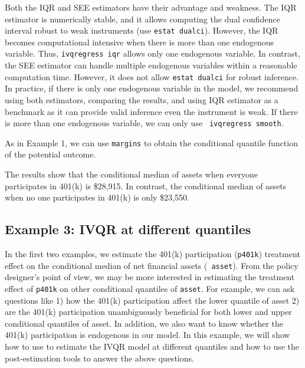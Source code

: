 Both the IQR and SEE estimators have their advantage and weakness. The IQR
estimator is numerically stable, and it allows computing the dual confidence
interval robust to weak instruments (use {\tt estat dualci}). However, the IQR
becomes computational intensive when there is more than one endogenous variable.
Thus, {\tt ivqregress iqr} allows only one endogenous variable. In contrast, the
SEE estimator can handle multiple endogenous variables within a reasonable
computation time. However, it does not allow {\tt estat dualci} for robust
inference. In practice, if there is only one endogenous variable in the model,
we recommend using both estimators, comparing the results, and using IQR
estimator as a benchmark as it can provide valid inference even the instrument
is weak.  If there is more than one endogenous variable, we can only use {\tt
ivqregress smooth}.

As in Example 1, we can use {\tt margins} to obtain the conditional quantile
function of the potential outcome.

\begin{stlog}

\end{stlog}

The results show that the conditional median of assets when everyone
participates in 401(k) is \$28,915. In contrast, the conditional median of
assets when no one participates in 401(k) is only \$23,550.


\subsection{Example 3: IVQR at different quantiles}
In the first two examples, we estimate the 401(k) participation ({\tt p401k})
treatment effect on the conditional median of net financial assets ({\tt
asset}).  From the policy designer's point of view, we may be more
interested in estimating the treatment effect of {\tt p401k} on other
conditional quantiles of {\tt asset}. For example, we can ask questions like 1)
how the 401(k) participation affect the lower quantile of asset 2) are the
401(k) participation unambiguously beneficial for both lower and upper
conditional quantiles of asset. In addition, we also want to know whether
the 401(k) participation is endogenous in our model. In this example, we will
show how to use {\ivqreg} to estimate the IVQR model at different quantiles and
how to use the post-estimation tools to answer the above questions.

